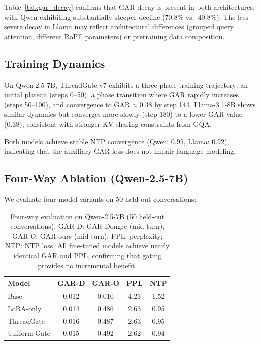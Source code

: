 \documentclass[11pt]{article}
\begin{document}
Table~\ref{tab:gar_decay} confirms that GAR decay is present in both architectures, with Qwen exhibiting substantially steeper decline (70.8\% vs.\ 40.8\%).
The less severe decay in Llama may reflect architectural differences (grouped query attention, different RoPE parameters) or pretraining data composition.

\subsection{Training Dynamics}

On Qwen-2.5-7B, ThreadGate v7 exhibits a three-phase training trajectory: an initial plateau (steps 0--50), a phase transition where GAR rapidly increases (steps 50--100), and convergence to GAR$\approx$0.48 by step 144.
Llama-3.1-8B shows similar dynamics but converges more slowly (step 180) to a lower GAR value (0.38), consistent with stronger KV-sharing constraints from GQA.

Both models achieve stable NTP convergence (Qwen: 0.95, Llama: 0.92), indicating that the auxiliary GAR loss does not impair language modeling.

\subsection{Four-Way Ablation (Qwen-2.5-7B)}

We evaluate four model variants on 50 held-out conversations:

\begin{table}[t]
\centering
\small
\begin{tabular}{lcccc}
\toprule
\textbf{Model} & \textbf{GAR-D} & \textbf{GAR-O} & \textbf{PPL} & \textbf{NTP} \\
\midrule
Base         & 0.012 & 0.010 & 4.23 & 1.52 \\
LoRA-only    & 0.014 & 0.486 & 2.63 & 0.95 \\
ThreadGate   & 0.016 & 0.487 & 2.63 & 0.95 \\
Uniform Gate & 0.015 & 0.492 & 2.62 & 0.94 \\
\bottomrule
\end{tabular}
\caption{Four-way evaluation on Qwen-2.5-7B (50 held-out conversations). GAR-D: GAR-Dongre (mid-turn); GAR-O: GAR-ours (mid-turn); PPL: perplexity; NTP: NTP loss. All fine-tuned models achieve nearly identical GAR and PPL, confirming that gating provides no incremental benefit.}
\label{tab:qwen_4way}
\end{table}
\end{document}
